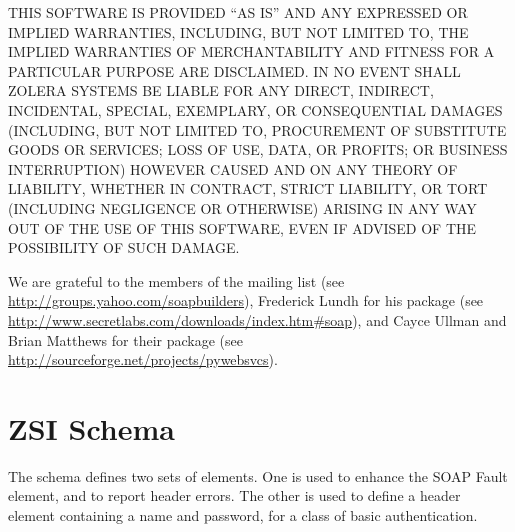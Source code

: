 \documentclass{manual}
\begin{document}
THIS SOFTWARE IS PROVIDED ``AS IS'' AND ANY EXPRESSED OR IMPLIED
WARRANTIES, INCLUDING, BUT NOT LIMITED TO, THE IMPLIED WARRANTIES OF
MERCHANTABILITY AND FITNESS FOR A PARTICULAR PURPOSE ARE DISCLAIMED.
IN NO EVENT SHALL ZOLERA SYSTEMS BE LIABLE FOR ANY DIRECT, INDIRECT,
INCIDENTAL, SPECIAL, EXEMPLARY, OR CONSEQUENTIAL DAMAGES (INCLUDING,
BUT NOT LIMITED TO, PROCUREMENT OF SUBSTITUTE GOODS OR SERVICES; LOSS OF
USE, DATA, OR PROFITS; OR BUSINESS INTERRUPTION) HOWEVER CAUSED AND ON
ANY THEORY OF LIABILITY, WHETHER IN CONTRACT, STRICT LIABILITY, OR TORT
(INCLUDING NEGLIGENCE OR OTHERWISE) ARISING IN ANY WAY OUT OF THE USE
OF THIS SOFTWARE, EVEN IF ADVISED OF THE POSSIBILITY OF SUCH DAMAGE.

\vfill

\centerline{}

We are grateful to the members of the 
mailing list (see \url{http://groups.yahoo.com/soapbuilders}),
Frederick Lundh for his  package (see
\url{http://www.secretlabs.com/downloads/index.htm\#soap}),
and Cayce Ullman and Brian Matthews for their  package
(see \url{http://sourceforge.net/projects/pywebsvcs}).

\tableofcontents{}
\def\ZSI{\module{ZSI}}












\chapter{ZSI Schema}

The \ZSI{} schema defines two sets of elements.  One is used to enhance
the SOAP Fault  element, and to report header errors.
The other is used to define a header element containing a name and
password, for a class of basic authentication.


\end{document}
